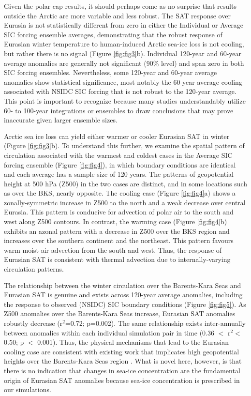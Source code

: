 \documentclass{nature}
\begin{document}
Given the polar cap results, it should perhaps come as no surprise that results outside the Arctic are more variable and less robust. The SAT response over Eurasia is not statistically different from zero in either the Individual or Average SIC forcing ensemble averages, demonstrating that the robust response of Eurasian winter temperature to human-induced Arctic sea-ice loss is not cooling, but rather there is no signal (Figure \ref{fig:fig3}b). Individual 120-year and 60-year average anomalies are generally not significant (90\% level) and span zero in both SIC forcing ensembles. Nevertheless, some 120-year and 60-year average anomalies show statistical significance, most notably the 60-year average cooling associated with NSIDC SIC forcing that is not robust to the 120-year average. This point is important to recognize because many studies understandably utilize 60- to 100-year integrations or ensembles to draw conclusions that may prove inaccurate given larger ensemble sizes.

Arctic sea ice loss can yield either warmer or cooler Eurasian SAT in winter (Figure \ref{fig:fig3}b). To understand this further, we examine the spatial pattern of circulation associated with the warmest and coldest cases in the Average SIC forcing ensemble (Figure \ref{fig:fig4}), in which boundary conditions are identical and each average has a sample size of 120 years. The patterns of geopotential height at 500 hPa (Z500) in the two cases are distinct, and in some locations such as over the BKS, nearly opposite. The cooling case (Figure \ref{fig:fig4}a) shows a zonally-symmetric increase in Z500 to the north and a weak decrease over central Eurasia. This pattern is conducive for advection of polar air to the south and west along Z500 contours. In contrast, the warming case (Figure \ref{fig:fig4}b) exhibits an azonal pattern with a decrease in Z500 over the BKS region and increases over the southern continent and the northeast. This pattern favours warm-moist air advection from the south and west. Thus, the response of Eurasian SAT is consistent with thermal advection due to internally-varying circulation patterns. 

The relationship between the winter circulation over the Barents-Kara Seas and Eurasian SAT is genuine and exists across 120-year average anomalies, including the response to observed (NSIDC) SIC boundary conditions (Figure \ref{fig:fig5}). As Z500 anomalies over the Barents-Kara Seas increase, Eurasian SAT anomalies robustly decrease (r$^2$=0.72; p=0.002). The same relationship exists inter-annually between anomalies within each individual simulation pair in time (0.36 $<$ r$^2<$ 0.50; p $<$ 0.001). Thus, the physical mechanisms that lead to the Eurasian cooling case are consistent with existing work that implicates high geopotential heights over the Barents-Kara Seas region \cite{honda09,petoukhov10,mori14}. What is novel here, however, is that there is no indication that changes in sea-ice concentration are the fundamental origin of Eurasian SAT anomalies because sea-ice concentration is prescribed in our simulations. 
\end{document}
